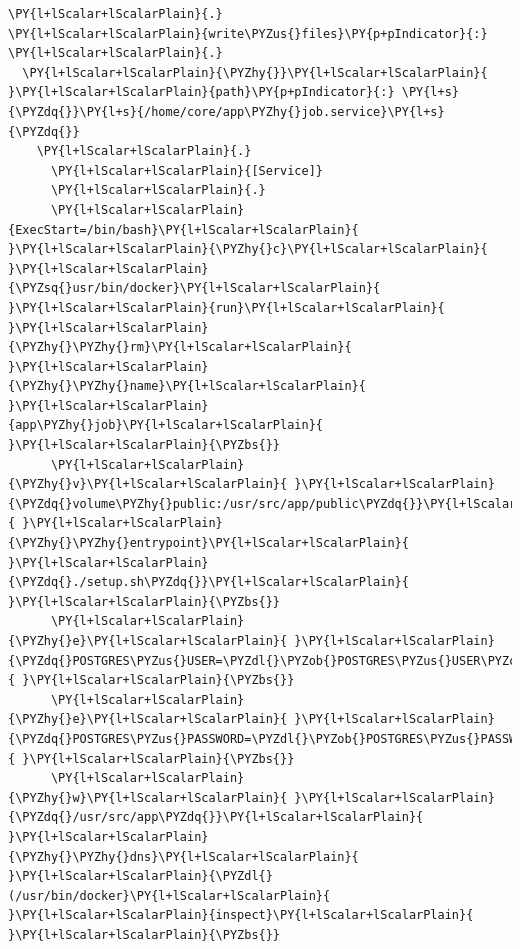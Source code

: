 \begin{codelisting}
\label{code:user-data-skydns-app}
\begin{Verbatim}[fontsize=\relsize{-2.5},fontseries=b,commandchars=\\\{\}]
\PY{l+lScalar+lScalarPlain}{.}
\PY{l+lScalar+lScalarPlain}{write\PYZus{}files}\PY{p+pIndicator}{:}
\PY{l+lScalar+lScalarPlain}{.}
  \PY{l+lScalar+lScalarPlain}{\PYZhy{}}\PY{l+lScalar+lScalarPlain}{ }\PY{l+lScalar+lScalarPlain}{path}\PY{p+pIndicator}{:} \PY{l+s}{\PYZdq{}}\PY{l+s}{/home/core/app\PYZhy{}job.service}\PY{l+s}{\PYZdq{}}
    \PY{l+lScalar+lScalarPlain}{.}
      \PY{l+lScalar+lScalarPlain}{[Service]}
      \PY{l+lScalar+lScalarPlain}{.}
      \PY{l+lScalar+lScalarPlain}{ExecStart=/bin/bash}\PY{l+lScalar+lScalarPlain}{ }\PY{l+lScalar+lScalarPlain}{\PYZhy{}c}\PY{l+lScalar+lScalarPlain}{ }\PY{l+lScalar+lScalarPlain}{\PYZsq{}usr/bin/docker}\PY{l+lScalar+lScalarPlain}{ }\PY{l+lScalar+lScalarPlain}{run}\PY{l+lScalar+lScalarPlain}{ }\PY{l+lScalar+lScalarPlain}{\PYZhy{}\PYZhy{}rm}\PY{l+lScalar+lScalarPlain}{ }\PY{l+lScalar+lScalarPlain}{\PYZhy{}\PYZhy{}name}\PY{l+lScalar+lScalarPlain}{ }\PY{l+lScalar+lScalarPlain}{app\PYZhy{}job}\PY{l+lScalar+lScalarPlain}{ }\PY{l+lScalar+lScalarPlain}{\PYZbs{}}
      \PY{l+lScalar+lScalarPlain}{\PYZhy{}v}\PY{l+lScalar+lScalarPlain}{ }\PY{l+lScalar+lScalarPlain}{\PYZdq{}volume\PYZhy{}public:/usr/src/app/public\PYZdq{}}\PY{l+lScalar+lScalarPlain}{ }\PY{l+lScalar+lScalarPlain}{\PYZhy{}\PYZhy{}entrypoint}\PY{l+lScalar+lScalarPlain}{ }\PY{l+lScalar+lScalarPlain}{\PYZdq{}./setup.sh\PYZdq{}}\PY{l+lScalar+lScalarPlain}{ }\PY{l+lScalar+lScalarPlain}{\PYZbs{}}
      \PY{l+lScalar+lScalarPlain}{\PYZhy{}e}\PY{l+lScalar+lScalarPlain}{ }\PY{l+lScalar+lScalarPlain}{\PYZdq{}POSTGRES\PYZus{}USER=\PYZdl{}\PYZob{}POSTGRES\PYZus{}USER\PYZcb{}\PYZdq{}}\PY{l+lScalar+lScalarPlain}{ }\PY{l+lScalar+lScalarPlain}{\PYZbs{}}
      \PY{l+lScalar+lScalarPlain}{\PYZhy{}e}\PY{l+lScalar+lScalarPlain}{ }\PY{l+lScalar+lScalarPlain}{\PYZdq{}POSTGRES\PYZus{}PASSWORD=\PYZdl{}\PYZob{}POSTGRES\PYZus{}PASSWORD\PYZcb{}\PYZdq{}}\PY{l+lScalar+lScalarPlain}{ }\PY{l+lScalar+lScalarPlain}{\PYZbs{}}
      \PY{l+lScalar+lScalarPlain}{\PYZhy{}w}\PY{l+lScalar+lScalarPlain}{ }\PY{l+lScalar+lScalarPlain}{\PYZdq{}/usr/src/app\PYZdq{}}\PY{l+lScalar+lScalarPlain}{ }\PY{l+lScalar+lScalarPlain}{\PYZhy{}\PYZhy{}dns}\PY{l+lScalar+lScalarPlain}{ }\PY{l+lScalar+lScalarPlain}{\PYZdl{}(/usr/bin/docker}\PY{l+lScalar+lScalarPlain}{ }\PY{l+lScalar+lScalarPlain}{inspect}\PY{l+lScalar+lScalarPlain}{ }\PY{l+lScalar+lScalarPlain}{\PYZbs{}}

\end{Verbatim}
\end{codelisting}
